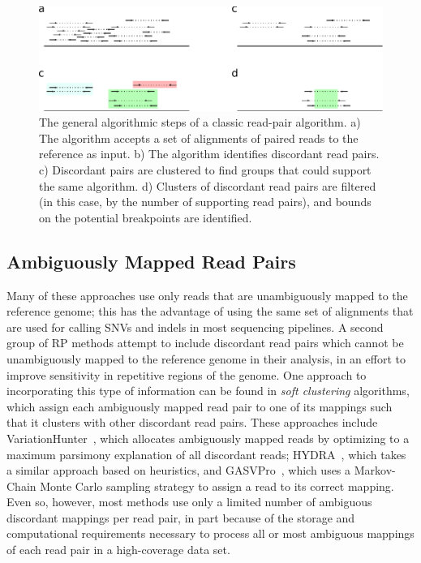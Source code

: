 \begin{figure}
\centering
\includegraphics[width=\textwidth]{figures/rp_method_workflow.pdf}
\caption{The general algorithmic steps of a classic read-pair algorithm. a) The algorithm accepts a set of alignments of paired reads to the reference as input. b) The algorithm identifies discordant read pairs. c) Discordant pairs are clustered to find groups that could support the same algorithm. d) Clusters of discordant read pairs are filtered (in this case, by the number of supporting read pairs), and bounds on the potential breakpoints are identified.}
\label{rp_method_workflow}
\end{figure}

\subsection{Ambiguously Mapped Read Pairs}

Many of these approaches use only reads that are unambiguously mapped to the reference genome; this has the advantage of using the same set of alignments that are used for calling SNVs and indels in most sequencing pipelines. A second group of RP methods attempt to include discordant read pairs which cannot be unambiguously mapped to the reference genome in their analysis, in an effort to improve sensitivity in repetitive regions of the genome. One approach to incorporating this type of information can be found in \emph{soft clustering} algorithms, which assign each ambiguously mapped read pair to one of its mappings such that it clusters with other discordant read pairs. These approaches include VariationHunter~\cite{Hormozdiari:2009p284}, which allocates ambiguously mapped reads by optimizing to a maximum parsimony explanation of all discordant reads; HYDRA~\cite{Quinlan:2010gf}, which takes a similar approach based on heuristics, and GASVPro~\cite{Sindi:2012kk}, which uses a Markov-Chain Monte Carlo sampling strategy to assign a read to its correct mapping. Even so, however, most methods use only a limited number of ambiguous discordant mappings per read pair, in part because of the storage and computational requirements necessary to process all or most ambiguous mappings of each read pair in a high-coverage data set.

